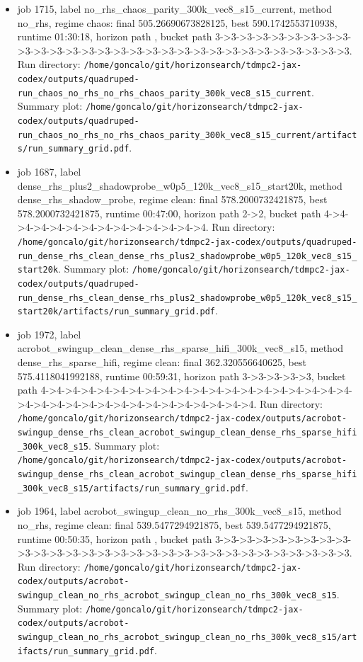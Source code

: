 \begin{itemize}
\item job 1715, label no\_rhs\_chaos\_parity\_300k\_vec8\_s15\_current, method no\_rhs, regime chaos: final 505.26690673828125, best 590.1742553710938, runtime 01:30:18, horizon path , bucket path 3->3->3->3->3->3->3->3->3->3->3->3->3->3->3->3->3->3->3->3->3->3->3->3->3->3->3->3->3->3. Run directory: \texttt{/home/goncalo/git/horizonsearch/tdmpc2-jax-codex/outputs/quadruped-run\_chaos\_no\_rhs\_no\_rhs\_chaos\_parity\_300k\_vec8\_s15\_current}. Summary plot: \texttt{/home/goncalo/git/horizonsearch/tdmpc2-jax-codex/outputs/quadruped-run\_chaos\_no\_rhs\_no\_rhs\_chaos\_parity\_300k\_vec8\_s15\_current/artifacts/run\_summary\_grid.pdf}.
\item job 1687, label dense\_rhs\_plus2\_shadowprobe\_w0p5\_120k\_vec8\_s15\_start20k, method dense\_rhs\_shadow\_probe, regime clean: final 578.2000732421875, best 578.2000732421875, runtime 00:47:00, horizon path 2->2, bucket path 4->4->4->4->4->4->4->4->4->4->4->4->4->4. Run directory: \texttt{/home/goncalo/git/horizonsearch/tdmpc2-jax-codex/outputs/quadruped-run\_dense\_rhs\_clean\_dense\_rhs\_plus2\_shadowprobe\_w0p5\_120k\_vec8\_s15\_start20k}. Summary plot: \texttt{/home/goncalo/git/horizonsearch/tdmpc2-jax-codex/outputs/quadruped-run\_dense\_rhs\_clean\_dense\_rhs\_plus2\_shadowprobe\_w0p5\_120k\_vec8\_s15\_start20k/artifacts/run\_summary\_grid.pdf}.
\item job 1972, label acrobot\_swingup\_clean\_dense\_rhs\_sparse\_hifi\_300k\_vec8\_s15, method dense\_rhs\_sparse\_hifi, regime clean: final 362.320556640625, best 575.4118041992188, runtime 00:59:31, horizon path 3->3->3->3->3, bucket path 4->4->4->4->4->4->4->4->4->4->4->4->4->4->4->4->4->4->4->4->4->4->4->4->4->4->4->4->4->4->4->4->4->4->4. Run directory: \texttt{/home/goncalo/git/horizonsearch/tdmpc2-jax-codex/outputs/acrobot-swingup\_dense\_rhs\_clean\_acrobot\_swingup\_clean\_dense\_rhs\_sparse\_hifi\_300k\_vec8\_s15}. Summary plot: \texttt{/home/goncalo/git/horizonsearch/tdmpc2-jax-codex/outputs/acrobot-swingup\_dense\_rhs\_clean\_acrobot\_swingup\_clean\_dense\_rhs\_sparse\_hifi\_300k\_vec8\_s15/artifacts/run\_summary\_grid.pdf}.
\item job 1964, label acrobot\_swingup\_clean\_no\_rhs\_300k\_vec8\_s15, method no\_rhs, regime clean: final 539.5477294921875, best 539.5477294921875, runtime 00:50:35, horizon path , bucket path 3->3->3->3->3->3->3->3->3->3->3->3->3->3->3->3->3->3->3->3->3->3->3->3->3->3->3->3->3->3. Run directory: \texttt{/home/goncalo/git/horizonsearch/tdmpc2-jax-codex/outputs/acrobot-swingup\_clean\_no\_rhs\_acrobot\_swingup\_clean\_no\_rhs\_300k\_vec8\_s15}. Summary plot: \texttt{/home/goncalo/git/horizonsearch/tdmpc2-jax-codex/outputs/acrobot-swingup\_clean\_no\_rhs\_acrobot\_swingup\_clean\_no\_rhs\_300k\_vec8\_s15/artifacts/run\_summary\_grid.pdf}.

\end{itemize}
